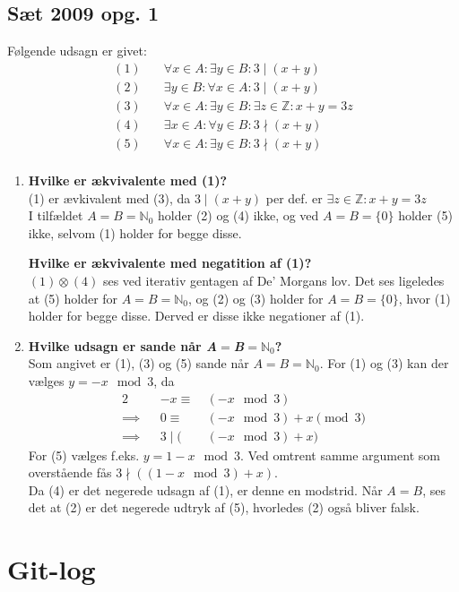\documentclass[12pt, a4paper]{article}
\begin{document}
\subsection{Sæt 2009 opg. 1}
Følgende udsagn er givet:
\begin{align*}
	(1)&\quad\forall x\in A:\exists y\in B:3\mid(x+y)\\
	(2)&\quad\exists y\in B:\forall x\in A:3\mid(x+y)\\
	(3)&\quad\forall x\in A:
		\exists y\in B:
		\exists z\in\mathbb{Z}:
		x+y=3z\\
	(4)&\quad\exists x\in A:\forall y\in B:3\nmid(x+y)\\
	(5)&\quad\forall x\in A:\exists y\in B:3\nmid(x+y)\\
\end{align*}
\begin{enumerate}[label=\alph*)]
	\item {
		\textbf{Hvilke er ækvivalente med (1)?} \\
		(1) er ævkivalent med (3), da $3\mid (x+y)$ per def. er $ \exists z\in\mathbb{Z}: x+y=3z$ \\
		I tilfældet $A=B=\mathbb{N}_0$ holder (2) og (4) ikke, og ved $A=B=\{0\}$ holder (5) ikke,
		selvom (1) holder for begge disse.
		
		\textbf{Hvilke er ækvivalente med negatition af (1)?} \\
		$(1)\otimes (4)$ ses ved iterativ gentagen af De' Morgans lov.
		Det ses ligeledes at (5) holder for $A=B=\mathbb{N}_0$, og (2) og (3) holder for $A=B=\{0\}$, hvor (1) holder for begge disse. Derved er disse ikke negationer af (1).
	}
	\item {
		\textbf{Hvilke udsagn er sande når \textit{A}$=$\textit{B}$=\mathbb{N}_0$?} \\
		Som angivet er (1), (3) og (5) sande når $A=B=\mathbb{N}_0$.
		For (1) og (3) kan der vælges $y=-x \mod 3$, da
		\begin{alignat*}{2}
			        && -x \equiv\ &(-x\!\!\!\mod 3)  \\
			\implies&&  0 \equiv\ &(-x\!\!\!\mod 3)+x \pmod{3} \\
			\implies&&    3 \mid (&(-x\!\!\!\mod 3)+x)
		\end{alignat*}	
		For (5) vælges f.eks. $y=1-x\!\!\mod 3$. Ved omtrent samme argument som overstående fås $3\nmid((1-x\!\!\mod 3)+x)$. \\
		Da (4) er det negerede udsagn af (1), er denne en modstrid.
		Når $A=B$, ses det at (2) er det negerede udtryk af (5), hvorledes (2) også bliver falsk.
	}
\end{enumerate}

\newpage
\section{Git-log}
\inputminted{bash}{git-log.txt}
\end{document}
